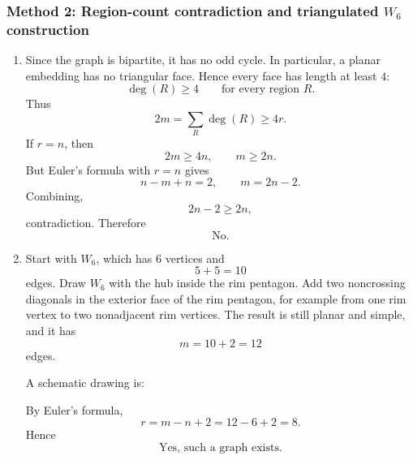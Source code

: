 \documentclass[12pt]{article}
\begin{document}
\subsubsection{Method 2: Region-count contradiction and triangulated $W_6$ construction}
\begin{enumerate}[label=(\alph*)]
  \item Since the graph is bipartite, it has no odd cycle. In particular, a planar embedding has no triangular face. Hence every face has length at least $4$:
  \[
    \deg(R)\ge 4
    \qquad
    \text{for every region }R.
  \]
  Thus
  \[
    2m=\sum_R\deg(R)\ge 4r.
  \]
  If $r=n$, then
  \[
    2m\ge 4n,
    \qquad
    m\ge 2n.
  \]
  But Euler's formula with $r=n$ gives
  \[
    n-m+n=2,
    \qquad
    m=2n-2.
  \]
  Combining,
  \[
    2n-2\ge 2n,
  \]
  contradiction. Therefore
  \[
    \boxed{\text{No}.}
  \]

  \item Start with $W_6$, which has $6$ vertices and
  \[
    5+5=10
  \]
  edges. Draw $W_6$ with the hub inside the rim pentagon. Add two noncrossing diagonals in the exterior face of the rim pentagon, for example from one rim vertex to two nonadjacent rim vertices. The result is still planar and simple, and it has
  \[
    m=10+2=12
  \]
  edges.

  A schematic drawing is:
  \begin{center}
  \end{center}

  By Euler's formula,
  \[
    r=m-n+2=12-6+2=8.
  \]
  Hence
  \[
    \boxed{\text{Yes, such a graph exists}.}
  \]
\end{enumerate}
\end{document}
